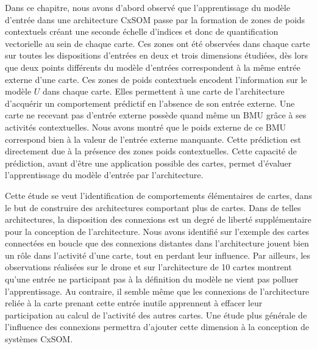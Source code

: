 \documentclass[../main]{subfiles}
\begin{document}
Dans ce chapitre, nous avons d'abord observé que l'apprentissage du modèle d'entrée dans une architecture CxSOM passe par la formation de zones de poids contextuels créant une seconde échelle d'indices et donc de quantification vectorielle au sein de chaque carte. Ces zones ont été observées dans chaque carte sur toutes les dispositions d'entrées en deux et trois dimensions étudiées, dès lors que deux points différents du modèle d'entrées correspondent à la même entrée externe d'une carte.
Ces zones de poids contextuels encodent l'information sur le modèle $U$ dans chaque carte. Elles permettent à une carte de l'architecture d'acquérir un comportement prédictif en l'absence de son entrée externe. Une carte ne recevant pas d'entrée externe possède quand même un BMU grâce à ses activités contextuelles. Nous avons montré que le poids externe de ce BMU correspond bien à la valeur de l'entrée externe manquante. Cette prédiction est directement due à la présence des zones poids contextuelles.
Cette capacité de prédiction, avant d'être une application possible des cartes, permet d'évaluer l'apprentissage du modèle d'entrée par l'architecture.

Cette étude se veut l'identification de comportements élémentaires de cartes, dans le but de construire des architectures comportant plus de cartes. Dans de telles architectures, la disposition des connexions est un degré de liberté supplémentaire pour la conception de l'architecture.
Nous avons identifié sur l'exemple des cartes connectées en boucle que des connexions distantes dans l'architecture jouent bien un rôle dans l'activité d'une carte, tout en perdant leur influence. Par ailleurs, les observations réalisées sur le drone et sur l'architecture de 10 cartes montrent qu'une entrée ne participant pas à la définition du modèle ne vient pas polluer l'apprentissage. Au contraire, il semble même que les connexions de l'architecture reliée à la carte prenant cette entrée inutile apprennent à effacer leur participation au calcul de l'activité des autres cartes.
Une étude plus générale de l'influence des connexions permettra d'ajouter cette dimension à la conception de systèmes CxSOM.
\end{document}

